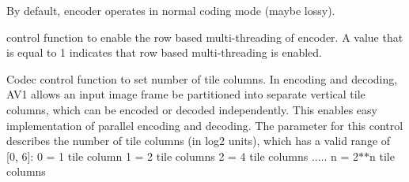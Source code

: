 \begin{Desc}
\begin{description}
By default, encoder operates in normal coding mode (maybe lossy). \item[{\em 
A\+V1\+E\+\_\+\+S\+E\+T\+\_\+\+R\+O\+W\+\_\+\+MT\hypertarget{group__aom__encoder_ggae78dde67a6d78f332e9bdba0dde42db5a095d0817d339940aa2578924a840fc84}{}\label{group__aom__encoder_ggae78dde67a6d78f332e9bdba0dde42db5a095d0817d339940aa2578924a840fc84}
}]control function to enable the row based multi-\/threading of encoder. A value that is equal to 1 indicates that row based multi-\/threading is enabled. \item[{\em 
A\+V1\+E\+\_\+\+S\+E\+T\+\_\+\+T\+I\+L\+E\+\_\+\+C\+O\+L\+U\+M\+NS\hypertarget{group__aom__encoder_ggae78dde67a6d78f332e9bdba0dde42db5acf4ab1ff2fa8d76a78881ad7f1a1294d}{}\label{group__aom__encoder_ggae78dde67a6d78f332e9bdba0dde42db5acf4ab1ff2fa8d76a78881ad7f1a1294d}
}]Codec control function to set number of tile columns. In encoding and decoding, A\+V1 allows an input image frame be partitioned into separate vertical tile columns, which can be encoded or decoded independently. This enables easy implementation of parallel encoding and decoding. The parameter for this control describes the number of tile columns (in log2 units), which has a valid range of \mbox{[}0, 6\mbox{]}\+: 0 = 1 tile column 1 = 2 tile columns 2 = 4 tile columns ..... n = 2$\ast$$\ast$n tile columns


\end{description}
\end{Desc}
